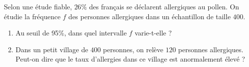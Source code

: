 
\begin{exercice}\label{exosmath-0329}

    Selon une étude fiable, \( 26\%\) des français se déclarent allergiques au pollen. On étudie la fréquence $f$ des personnes allergiques dans un échantillon de taille $400$.
    \begin{enumerate}
        \item
 Au seuil de 95\%, dans quel intervalle $f$ varie-t-elle ?
 \item
    Dans un petit village de $400$ personnes, on relève $120$ personnes allergiques. Peut-on dire que le taux d’allergies dans ce village est anormalement élevé ?
    \end{enumerate}

\end{exercice}
